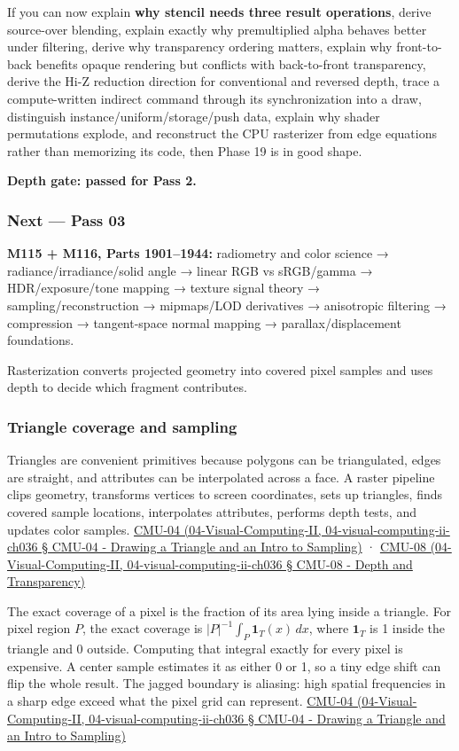 If you can now explain \textbf{why stencil needs three result operations}, derive source-over blending, explain exactly why premultiplied alpha behaves better under filtering, derive why transparency ordering matters, explain why front-to-back benefits opaque rendering but conflicts with back-to-front transparency, derive the Hi-Z reduction direction for conventional and reversed depth, trace a compute-written indirect command through its synchronization into a draw, distinguish instance/uniform/storage/push data, explain why shader permutations explode, and reconstruct the CPU rasterizer from edge equations rather than memorizing its code, then Phase 19 is in good shape.

\textbf{Depth gate: passed for Pass 2.}

\subsubsection{Next --- Pass 03}\label{next-pass-03}

\textbf{M115 + M116, Parts 1901--1944:} radiometry and color science → radiance/irradiance/solid angle → linear RGB vs sRGB/gamma → HDR/exposure/tone mapping → texture signal theory → sampling/reconstruction → mipmaps/LOD derivatives → anisotropic filtering → compression → tangent-space normal mapping → parallax/displacement foundations.

Rasterization converts projected geometry into covered pixel samples and uses depth to decide which fragment contributes.

\subsubsection{Triangle coverage and sampling}\label{triangle-coverage-and-sampling}

Triangles are convenient primitives because polygons can be triangulated, edges are straight, and attributes can be interpolated across a face. A raster pipeline clips geometry, transforms vertices to screen coordinates, sets up triangles, finds covered sample locations, interpolates attributes, performs depth tests, and updates color samples. \href{}{CMU-04 (04-Visual-Computing-II, 04-visual-computing-ii-ch036 § CMU-04 - Drawing a Triangle and an Intro to Sampling)} · \href{}{CMU-08 (04-Visual-Computing-II, 04-visual-computing-ii-ch036 § CMU-08 - Depth and Transparency)}

The exact coverage of a pixel is the fraction of its area lying inside a triangle. For pixel region \(P\), the exact coverage is \(|P|^{-1}\int_P \mathbf 1_T(x)\,dx\), where \(\mathbf 1_T\) is 1 inside the triangle and 0 outside. Computing that integral exactly for every pixel is expensive. A center sample estimates it as either 0 or 1, so a tiny edge shift can flip the whole result. The jagged boundary is aliasing: high spatial frequencies in a sharp edge exceed what the pixel grid can represent. \href{}{CMU-04 (04-Visual-Computing-II, 04-visual-computing-ii-ch036 § CMU-04 - Drawing a Triangle and an Intro to Sampling)}

